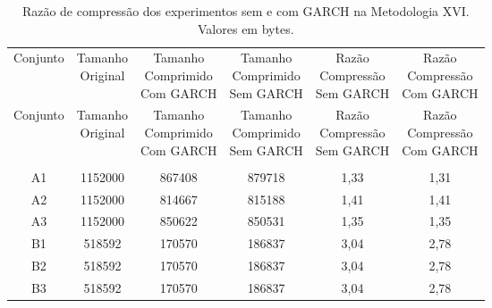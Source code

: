 \begin{center}
\begin{longtable}{cccccc}
\toprule
\rowcolor{white}
\caption[Metodologia XVI: Razão de compressão]{Razão de compressão dos
experimentos sem e com GARCH na Metodologia XVI.
Valores em bytes.} \label{Tab:razaocompressaoMet} \\
\midrule
Conjunto & \specialcell{Tamanho \\Original} & \specialcell{Tamanho
\\Comprimido\\Com GARCH} & \specialcell{Tamanho
\\Comprimido\\Sem GARCH} & \specialcell{Razão \\Compressão
\\Sem GARCH} & \specialcell{Razão \\Compressão
\\Com GARCH} \\
\midrule
\endfirsthead
\midrule
\rowcolor{white}
Conjunto & \specialcell{Tamanho \\Original} & \specialcell{Tamanho
\\Comprimido\\Com GARCH} & \specialcell{Tamanho
\\Comprimido\\Sem GARCH} & \specialcell{Razão \\Compressão
\\Sem GARCH} & \specialcell{Razão \\Compressão
\\Com GARCH} \\
\toprule
\endhead
\midrule \\ %
\endfoot
\bottomrule
\endlastfoot
    A1    & 1152000 & 867408 & 879718 & 1,33  & 1,31 \\
    A2    & 1152000 & 814667 & 815188 & 1,41  & 1,41 \\
    A3    & 1152000 & 850622 & 850531 & 1,35  & 1,35 \\
    B1    & 518592 & 170570 & 186837 & 3,04  & 2,78 \\
    B2    & 518592 & 170570 & 186837 & 3,04  & 2,78 \\
    B3    & 518592 & 170570 & 186837 & 3,04  & 2,78 \\

\end{longtable}
\end{center}
